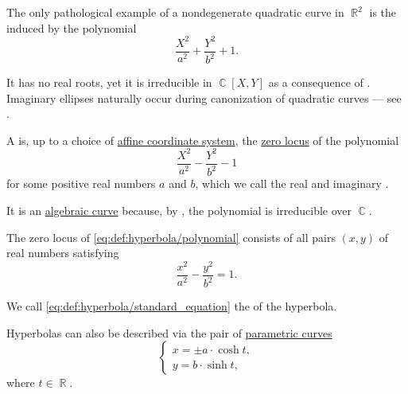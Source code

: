 \begin{example}\label{ex:imaginary_ellipse}
  The only pathological example of a nondegenerate quadratic curve in \( \BbbR^2 \) is the  induced by the polynomial
  \begin{equation}\label{eq:ex:imaginary_ellipse}
    \frac {X^2} {a^2} + \frac {Y^2} {b^2} + 1.
  \end{equation}

  It has no real roots, yet it is irreducible in \( \BbbC[X, Y] \) as a consequence of . Imaginary ellipses naturally occur during canonization of quadratic curves --- see .
\end{example}

\begin{definition}\label{def:hyperbola}
  A  is, up to a choice of \hyperref[def:affine_coordinate_system]{affine coordinate system}, the \hyperref[def:zero_locus]{zero locus} of the polynomial
  \begin{equation}\label{eq:def:hyperbola/polynomial}
    \frac {X^2} {a^2} - \frac {Y^2} {b^2} - 1
  \end{equation}
  for some positive real numbers \( a \) and \( b \), which we call the real and imaginary .

  It is an \hyperref[def:affine_algebraic_set/curve]{algebraic curve} because, by , the polynomial is irreducible over \( \BbbC \).

  \begin{thmenum}
     The zero locus of \eqref{eq:def:hyperbola/polynomial} consists of all pairs \( (x, y) \) of real numbers satisfying
    \begin{equation}\label{eq:def:hyperbola/standard_equation}
      \frac {x^2} {a^2} - \frac {y^2} {b^2} = 1.
    \end{equation}

    We call \eqref{eq:def:hyperbola/standard_equation} the  of the hyperbola.

     Hyperbolas can also be described via the pair of \hyperref[def:parametric_curve]{parametric curves}
    \begin{equation}\label{eq:def:hyperbola/parametric_equation}
      \begin{cases}
        x = \pm a \cdot \cosh t, \\
        y = b \cdot \sinh t,
      \end{cases}
    \end{equation}
    where \( t \in \BbbR \).
  \end{thmenum}
\end{definition}
